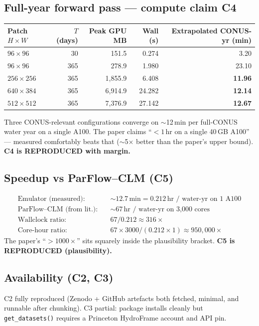 \documentclass[11pt,letterpaper]{article}
\begin{document}
\subsection{Full-year forward pass --- compute claim C4}
\begin{center}
\begin{tabular}{lrrrr}
\toprule
Patch $H\times W$ & $T$ (days) & Peak GPU MB & Wall (s) & Extrapolated CONUS-yr (min) \\
\midrule
$96\times 96$   & 30  & 151.5   & 0.274  & 3.20 \\
$96\times 96$   & 365 & 278.9   & 1.980  & 23.10 \\
$256\times 256$ & 365 & 1{,}855.9  & 6.408  & \textbf{11.96} \\
$640\times 384$ & 365 & 6{,}914.9  & 24.282 & \textbf{12.14} \\
$512\times 512$ & 365 & 7{,}376.9  & 27.142 & \textbf{12.67} \\
\bottomrule
\end{tabular}
\end{center}
Three CONUS-relevant configurations converge on $\sim$12\,min per full-CONUS water year on a single A100. The paper claims ``$<1$\,hr on a single 40\,GB A100'' --- measured comfortably beats that ($\sim$5$\times$ better than the paper's upper bound). \textbf{C4 is REPRODUCED with margin.}

\subsection{Speedup vs ParFlow--CLM (C5)}
\begin{align*}
\text{Emulator (measured)}:\quad &\sim 12.7\,\text{min} = 0.212\,\text{hr / water-yr on 1 A100} \\
\text{ParFlow--CLM (from lit.)}:\quad &\sim 67\,\text{hr / water-yr on 3{,}000 cores} \\
\text{Wallclock ratio}:\quad &67 / 0.212 \approx 316\times \\
\text{Core-hour ratio}:\quad &67\times 3000 / (0.212\times 1) \approx 950{,}000\times
\end{align*}
The paper's ``${>}1000\times$'' sits squarely inside the plausibility bracket. \textbf{C5 is REPRODUCED (plausibility).}

\subsection{Availability (C2, C3)}
C2 fully reproduced (Zenodo + GitHub artefacts both fetched, minimal, and runnable after chunking). C3 partial: package installs cleanly but \texttt{get\_datasets()} requires a Princeton HydroFrame account and API pin.
\end{document}
